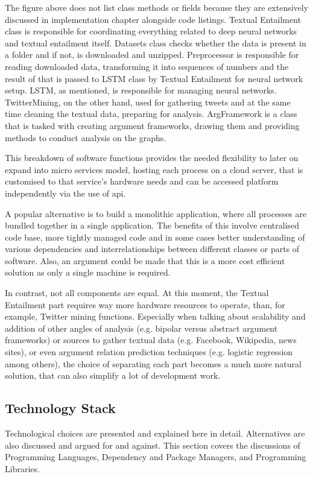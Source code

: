         The figure above does not list class methods or fields because they are extensively discussed in implementation chapter alongside code listings. Textual Entailment class is responsible for coordinating everything related to deep neural networks and textual entailment itself. Datasets class checks whether the data is present in a folder and if not, is downloaded and unzipped. Preprocessor is responsible for reading downloaded data, transforming it into sequences of numbers and the result of that is passed to LSTM class by Textual Entailment for neural network setup. LSTM, as mentioned, is responsible for managing neural networks. TwitterMining, on the other hand, used for gathering tweets and at the same time cleaning the textual data, preparing for analysis. ArgFramework is a class that is tasked with creating argument frameworks, drawing them and providing methods to conduct analysis on the graphs.
        
        This breakdown of software functions provides the needed flexibility to later on expand into micro services model, hosting each process on a cloud server, that is customised to that service's hardware needs and can be accessed platform independently via the use of \gls{api}.
        
        A popular alternative is to build a monolithic application, where all processes are bundled together in a single application. The benefits of this involve centralised code base, more tightly managed code and in some cases better understanding of various dependencies and interrelationships between different classes or parts of software. Also, an argument could be made that this is a more cost efficient solution as only a single machine is required. 
        
        In contrast, not all components are equal. At this moment, the Textual Entailment part requires way more hardware resources to operate, than, for example, Twitter mining functions. Especially when talking about scalability and addition of other angles of analysis (e.g. bipolar versus abstract argument frameworks) or sources to gather textual data (e.g. Facebook, Wikipedia, news sites), or even argument relation prediction techniques (e.g. logistic regression among others), the choice of separating each part becomes a much more natural solution, that can also simplify a lot of development work.
    
    \subsection{Technology Stack} \label{techstack}
        Technological choices are presented and explained here in detail. Alternatives are also discussed and argued for and against. This section covers the discussions of Programming Languages, Dependency and Package Managers, and Programming Libraries.
        
